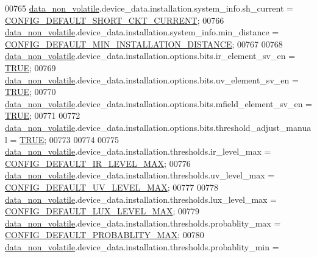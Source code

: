 \begin{DoxyCode}
00765         \hyperlink{a00060_a76ac5f917f5308dcd83de0d7c94559fb}{data\_non\_volatile}.device\_data.installation.system\_info.sh\_current               = 
      \hyperlink{a00021_a9b142f2e7d26511af74c411c0e524384}{CONFIG\_DEFAULT\_SHORT\_CKT\_CURRENT};
00766         \hyperlink{a00060_a76ac5f917f5308dcd83de0d7c94559fb}{data\_non\_volatile}.device\_data.installation.system\_info.min\_distance             = 
      \hyperlink{a00021_aad4ef21bb535ed8bbba5a4f2d0451711}{CONFIG\_DEFAULT\_MIN\_INSTALLATION\_DISTANCE};
00767 
00768         \hyperlink{a00060_a76ac5f917f5308dcd83de0d7c94559fb}{data\_non\_volatile}.device\_data.installation.options.bits.ir\_element\_sv\_en        = 
      \hyperlink{a00040_aa8cecfc5c5c054d2875c03e77b7be15d}{TRUE};
00769         \hyperlink{a00060_a76ac5f917f5308dcd83de0d7c94559fb}{data\_non\_volatile}.device\_data.installation.options.bits.uv\_element\_sv\_en        = 
      \hyperlink{a00040_aa8cecfc5c5c054d2875c03e77b7be15d}{TRUE};
00770         \hyperlink{a00060_a76ac5f917f5308dcd83de0d7c94559fb}{data\_non\_volatile}.device\_data.installation.options.bits.mfield\_element\_sv\_en    = 
      \hyperlink{a00040_aa8cecfc5c5c054d2875c03e77b7be15d}{TRUE};
00771 
00772         \hyperlink{a00060_a76ac5f917f5308dcd83de0d7c94559fb}{data\_non\_volatile}.device\_data.installation.options.bits.threshold\_adjust\_manual = 
      \hyperlink{a00040_aa8cecfc5c5c054d2875c03e77b7be15d}{TRUE};
00773 
00774 
00775         \hyperlink{a00060_a76ac5f917f5308dcd83de0d7c94559fb}{data\_non\_volatile}.device\_data.installation.thresholds.ir\_level\_max              = 
      \hyperlink{a00021_adf882de105367de21f0cbfe4490a046f}{CONFIG\_DEFAULT\_IR\_LEVEL\_MAX};
00776         \hyperlink{a00060_a76ac5f917f5308dcd83de0d7c94559fb}{data\_non\_volatile}.device\_data.installation.thresholds.uv\_level\_max              = 
      \hyperlink{a00021_a29f761c18bae89d087200e4f1891c651}{CONFIG\_DEFAULT\_UV\_LEVEL\_MAX};
00777         
00778         \hyperlink{a00060_a76ac5f917f5308dcd83de0d7c94559fb}{data\_non\_volatile}.device\_data.installation.thresholds.lux\_level\_max             = 
      \hyperlink{a00021_a04ab25767fbb61ec61784da889ec8c09}{CONFIG\_DEFAULT\_LUX\_LEVEL\_MAX};
00779         \hyperlink{a00060_a76ac5f917f5308dcd83de0d7c94559fb}{data\_non\_volatile}.device\_data.installation.thresholds.probablity\_max            = 
      \hyperlink{a00021_a96cf926b530a1d5968881620d2f10445}{CONFIG\_DEFAULT\_PROBABLITY\_MAX};
00780         \hyperlink{a00060_a76ac5f917f5308dcd83de0d7c94559fb}{data\_non\_volatile}.device\_data.installation.thresholds.probablity\_min            = 

\end{DoxyCode}
